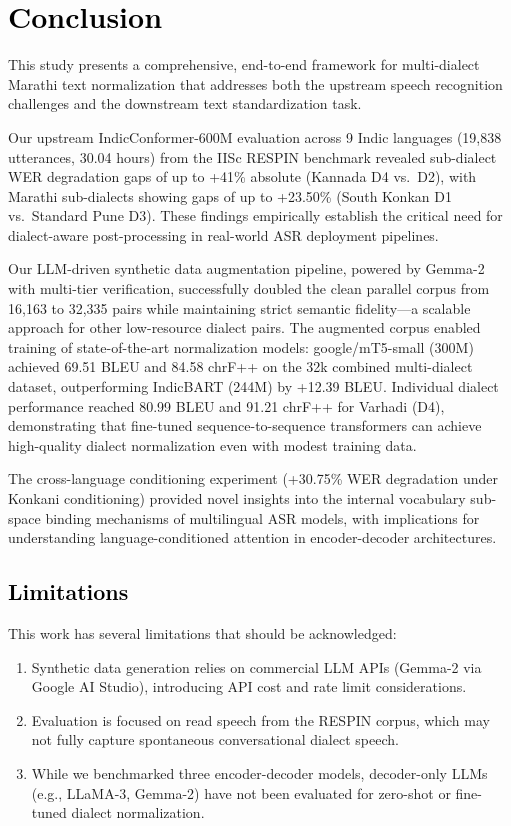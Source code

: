 \section{\textcolor{black}{Conclusion}}
\label{sec:conclusion}

This study presents a comprehensive, end-to-end framework for multi-dialect Marathi text normalization that addresses both the upstream speech recognition challenges and the downstream text standardization task.

Our upstream IndicConformer-600M evaluation across 9 Indic languages (19,838 utterances, 30.04 hours) from the IISc RESPIN benchmark revealed sub-dialect WER degradation gaps of up to +41\% absolute (Kannada D4 vs.\ D2), with Marathi sub-dialects showing gaps of up to +23.50\% (South Konkan D1 vs.\ Standard Pune D3). These findings empirically establish the critical need for dialect-aware post-processing in real-world ASR deployment pipelines.

Our LLM-driven synthetic data augmentation pipeline, powered by Gemma-2 with multi-tier verification, successfully doubled the clean parallel corpus from 16,163 to 32,335 pairs while maintaining strict semantic fidelity---a scalable approach for other low-resource dialect pairs. The augmented corpus enabled training of state-of-the-art normalization models: google/mT5-small (300M) achieved 69.51 BLEU and 84.58 chrF++ on the 32k combined multi-dialect dataset, outperforming IndicBART (244M) by +12.39 BLEU. Individual dialect performance reached 80.99 BLEU and 91.21 chrF++ for Varhadi (D4), demonstrating that fine-tuned sequence-to-sequence transformers can achieve high-quality dialect normalization even with modest training data.

The cross-language conditioning experiment (+30.75\% WER degradation under Konkani conditioning) provided novel insights into the internal vocabulary sub-space binding mechanisms of multilingual ASR models, with implications for understanding language-conditioned attention in encoder-decoder architectures.

\subsection{\textcolor{black}{Limitations}}

This work has several limitations that should be acknowledged:
\begin{enumerate}
    \item Synthetic data generation relies on commercial LLM APIs (Gemma-2 via Google AI Studio), introducing API cost and rate limit considerations.
    \item Evaluation is focused on read speech from the RESPIN corpus, which may not fully capture spontaneous conversational dialect speech.
    \item While we benchmarked three encoder-decoder models, decoder-only LLMs (e.g., LLaMA-3, Gemma-2) have not been evaluated for zero-shot or fine-tuned dialect normalization.
\end{enumerate}


